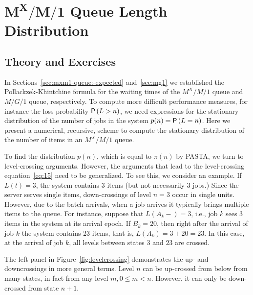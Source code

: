 \section
[$M^X/M/1$ Queue Length Distribution]
{$\mathbf{M^X/M/1}$ Queue Length Distribution}
\label{sec:batch-arrivals}


\subsection*{Theory and Exercises}


In Sections~\ref{sec:mxm1-queue:-expected} and~\ref{sec:mg1} we established the Pollackzek-Khintchine formula for the waiting times of the $M^X/M/1$ queue and $M/G/1$ queue, respectively. To compute more difficult performance measures, for instance the loss
probability $\P{L>n}$, we need expressions for the stationary distribution of the number of jobs in the system $p(n)=\P{L=n}$.   Here we present a numerical, recursive, scheme to compute the stationary distribution of the number of items in an $M^X/M/1$ queue. 

To find the distribution $p(n)$, which is equal to $\pi(n)$ by PASTA,
we turn to level-crossing arguments. However, the arguments that lead
to the level-crossing equation~\eqref{eq:15} need to be generalized.  To
see this, we consider an example.  If $L(t)=3$, the system contains
$3$ items (but not necessarily $3$ jobs.)  Since the server serves
single items, down-crossings of level $n=3$ occur in single
units. However, due to the batch arrivals, when a job arrives it
typically brings multiple items to the queue. For instance, suppose
that $L(A_k-) = 3$, i.e., job $k$ sees 3 items in the system at its
arrival epoch.  If $B_k = 20$, then  right
after the arrival of job $k$ the system contains 23 items, that is, $L(A_k)=3+20=23$. In this
case, at the arrival of job $k$, all levels between states $3$ and
$23$ are crossed.  

The left panel in Figure~\ref{fig:levelcrossing} demonstrates the up- and downcrossings in more general terms.  Level $n$ can be up-crossed
from below from many states, in fact from any level $m, 0\leq m <n$. However,
it can only be down-crossed from state $n+1$.



